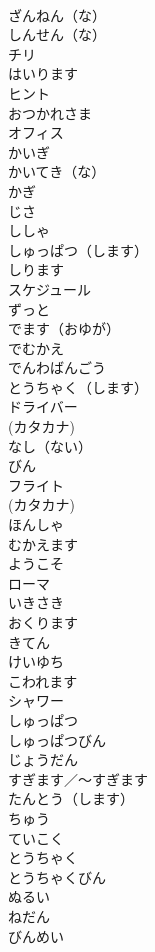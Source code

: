 \documentclass[8pt]{extreport}
\begin{document}
\begin{CJK}{UTF8}{min}
\\	ざんねん（な）	
\\	しんせん（な）	
\\	チリ	
\\	はいります	
\\	ヒント	
\\	おつかれさま	
\\	オフィス	
\\	かいぎ	
\\	かいてき（な）	
\\	かぎ	
\\	じさ	
\\	ししゃ	
\\	しゅっぱつ（します）	
\\	しります	
\\	スケジュール	
\\	ずっと	
\\	でます（おゆが）	
\\	でむかえ	
\\	でんわばんごう	
\\	とうちゃく（します）	
\\	ドライバー	
\\	(カタカナ)
\\	なし（ない）	
\\	びん	
\\	フライト	
\\	(カタカナ)
\\	ほんしゃ	
\\	むかえます	
\\	ようこそ	
\\	ローマ	
\\	いきさき	
\\	おくります	
\\	きてん	
\\	けいゆち	
\\	こわれます	
\\	シャワー	
\\	しゅっぱつ	
\\	しゅっぱつびん	
\\	じょうだん	
\\	すぎます／～すぎます	
\\	たんとう（します）	
\\	ちゅう	
\\	ていこく	
\\	とうちゃく	
\\	とうちゃくびん	
\\	ぬるい	
\\	ねだん	
\\	びんめい	

\end{CJK}
\end{document}
